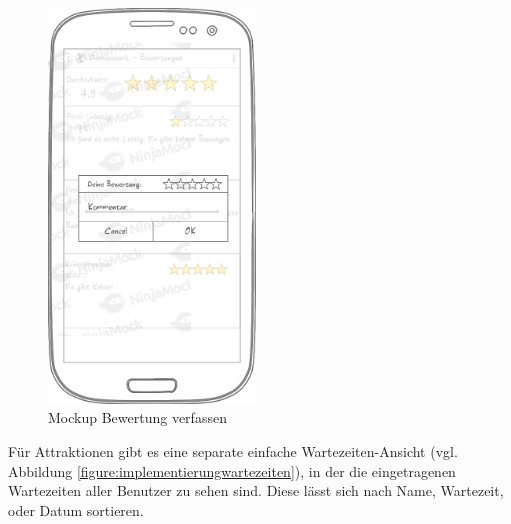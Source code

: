 \begin{figure}[h]
\begin{minipage}{0.49\textwidth}
        \includegraphics[width=0.49\textwidth]{img/mockups/m_bewertung_verfassen.png}
        \caption{Mockup Bewertung verfassen}
    \end{minipage}
\end{figure}

Für Attraktionen gibt es eine separate einfache Wartezeiten-Ansicht (vgl. Abbildung \ref{figure:implementierungwartezeiten}), in der die eingetragenen Wartezeiten aller Benutzer zu sehen sind. Diese lässt sich nach Name, Wartezeit, oder Datum sortieren.

